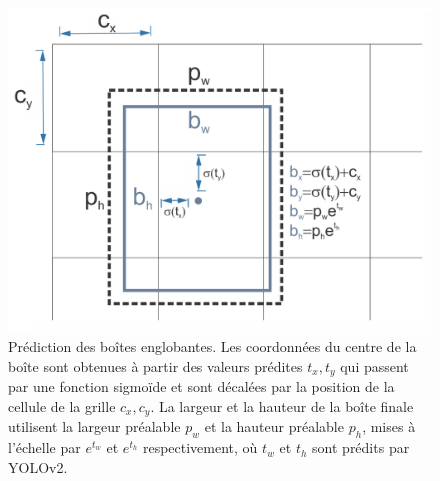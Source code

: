 \documentclass{article}
\begin{document}
\begin{figure}[htbp]
    \centering
    \includegraphics[scale=0.25]{Figures/bounding.png}
    \caption{Prédiction des boîtes englobantes. Les coordonnées du centre de la boîte sont obtenues à partir des valeurs prédites $t_x, t_y$ qui passent par une fonction sigmoïde et sont décalées par la position de la cellule de la grille $c_x, c_y$. La largeur et la hauteur de la boîte finale utilisent la largeur préalable $p_w$ et la hauteur préalable $p_h$, mises à l'échelle par $e^{t_w}$ et $e^{t_h}$ respectivement, où $t_w$ et $t_h$ sont prédits par YOLOv2.}
    \label{fig:bounding}
\end{figure}
\end{document}
